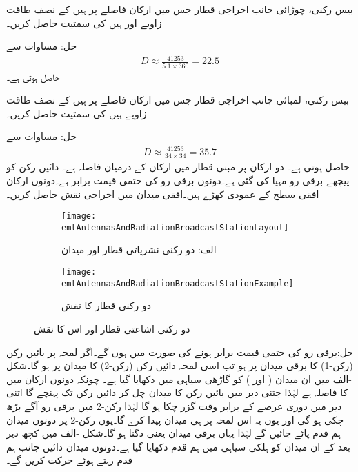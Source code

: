 بیس رکنی، چوڑائی جانب اخراجی قطار جس میں ارکان  فاصلے پر ہیں کے نصف طاقت زاویے  اور  ہیں کی سمتیت حاصل کریں۔

حل: مساوات  سے 
\begin{align*}
D \approx \frac{\num{41253}}{5.1 \times 360}=22.5
\end{align*}
حاصل ہوتی ہے۔


بیس رکنی، لمبائی جانب اخراجی قطار جس میں ارکان  فاصلے پر ہیں کے نصف طاقت زاویے  ہیں کی سمتیت حاصل کریں۔

حل: مساوات  سے 
\begin{align*}
D \approx \frac{\num{41253}}{34 \times 34}=35.7
\end{align*}
حاصل ہوتی ہے۔
دو ارکان پر مبنی قطار میں ارکان کے درمیان فاصلہ  ہے۔ دائیں رکن کو  پیچھے برقی رو مہیا کی گئی ہے۔دونوں برقی رو کی حتمی قیمت برابر ہے۔دونوں ارکان افقی سطح کے عمودی کھڑے ہیں۔افقی میدان میں اخراجی نقش حاصل کریں۔
   
\begin{figure}
\centering
\begin{subfigure}{0.4\textwidth}
\centering
\texttt{[image: emtAntennasAndRadiationBroadcastStationLayout]}
\caption*{الف: دو رکنی نشریاتی قطار اور میدان}
\end{subfigure}%
%
\begin{subfigure}{0.4\textwidth}
\centering
\texttt{[image: emtAntennasAndRadiationBroadcastStationExample]}
\caption*{دو رکنی قطار کا نقش}
\end{subfigure}%
\caption{دو رکنی اشاعتی قطار اور اس کا نقش}
\label{شکل_اینٹینا_اشاعتی_قطار}
\end{figure}

حل:برقی رو کی حتمی قیمت برابر ہونے کی صورت میں  ہوں گے۔اگر لمحہ  پر بائیں رکن (رکن-1) کا برقی میدان  پر ہو تب اسی لمحہ دائیں رکن (رکن-2) کا میدان  پر ہو گا۔شکل -الف میں ان میدان ( اور ) کو گاڑھی سیاہی میں دکھایا گیا ہے۔ چونکہ دونوں ارکان میں  کا فاصلہ ہے لہٰذا جتنی دیر میں بائیں رکن کا میدان  چل کر دائیں رکن تک پہنچے گا اتنی دیر میں دوری عرصے کے  برابر وقت گزر چکا ہو گا لہٰذا رکن-2 میں برقی رو  آگے بڑھ چکی ہو گی اور یوں یہ اس لمحہ  پر ہی میدان پیدا کرے گا۔یوں رکن-2 پر دونوں میدان ہم قدم پائے جائیں گے لہٰذا یہاں برقی میدان  یعنی دگنا ہو گا۔شکل -الف میں کچھ دیر بعد کے ان میدان کو ہلکی سیاہی میں ہم قدم دکھایا گیا ہے۔دونوں میدان دائیں جانب ہم قدم رہتے ہوئے حرکت کریں گے۔

